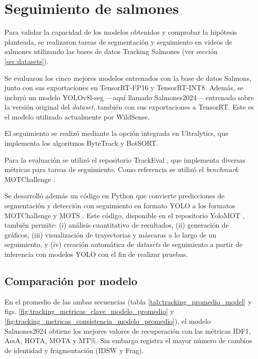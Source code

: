 \section{Seguimiento de salmones}
Para validar la capacidad de los modelos obtenidos y comprobar la hipótesis planteada, se realizaron tareas de segmentación y seguimiento en videos de salmones utilizando las bases de datos Tracking Salmones (ver sección \ref{sec:datasets}).

Se evaluaron los cinco mejores modelos entrenados con la base de datos Salmons, junto con sus exportaciones en TensorRT-FP16 y TensorRT-INT8. Además, se incluyó un modelo YOLOv8l-seg ---aquí llamado Salmones2024--- entrenado sobre la versión original del \textit{dataset}, también con sus exportaciones a TensorRT. Este es el modelo utilizado actualmente por WildSense.

El seguimiento se realizó mediante la opción integrada en Ultralytics, que implementa los algoritmos ByteTrack y BotSORT.

Para la evaluación se utilizó el repositorio TrackEval \cite{TrackEval}, que implementa diversas métricas para tareas de seguimiento. Como referencia se utilizó el \textit{benchmark} MOTChallenge \cite{MOTChallenge}. 

Se desarrolló además un código en Python que convierte predicciones de segmentación y detección con seguimiento en formato YOLO a los formatos MOTChallenge y MOTS \cite{MOTSChallenge}. Este código, disponible en el repositorio YoloMOT \cite{Lopez2025-YoloMOT}, también permite: (i) análisis cuantitativo de resultados, (ii) generación de gráficos, (iii) visualización de trayectorias y máscaras a lo largo de un seguimiento, y (iv) creación automática de \textit{datasets} de seguimiento a partir de inferencia con modelos YOLO con el fin de realizar pruebas.

\subsection{Comparación por modelo}
En el promedio de las ambas secuencias (tabla \ref{tab:tracking_promedio_model} y figs. \ref{fig:tracking_metricas_clave_modelo_promedio} y \ref{fig:tracking_metricas_consistencia_modelo_promedio}), el modelo Salmones2024 obtiene los mejores valores de recuperación con las métricas IDF1, AssA, HOTA, MOTA y MT\%. Sin embargo registra el mayor número de cambios de identidad y fragmentación (IDSW y Frag).

